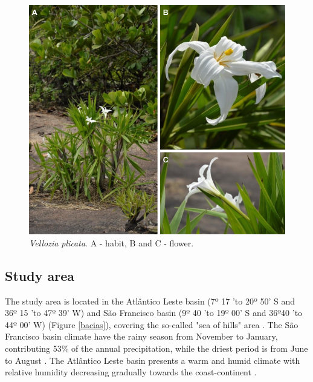 \begin{figure}
  \centering
  \includegraphics[width=90 mm]{figs/velozia.png} 
  \caption{\textit{Vellozia plicata}. A - habit, B and C - flower.}
 \label{velozia}
\end{figure}

\subsection{Study area}

The study area is located in the Atlântico Leste basin (7º 17 'to 20º 50' S and 36º 15 'to 47º 39' W) and São Francisco basin (9º 40 'to 19º 00' S and 36º40 'to 44º 00' W) (Figure \ref{bacias}), covering the so-called "sea of hills" area \citep{absaber1967DominiosMorfoclimaticosProvincias}. The São Francisco basin climate have the rainy season from November to January, contributing 53\% of the annual precipitation, while the driest period is from June to August \citep{mma-ministeriodomeioambiente2006CadernoRegiaoHidrografica}. The Atlântico Leste basin presents a warm and humid climate with relative humidity decreasing gradually towards the coast-continent \citep{mma-ministeriodomeioambiente2006AtlanticoSudesteCaderno}.

